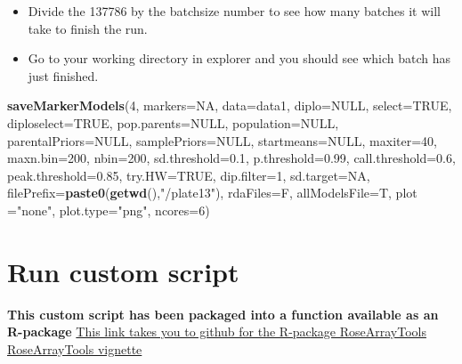\documentclass[
]{article}
\newenvironment{Shaded}{\begin{snugshade}}{\end{snugshade}}
\newcommand{\DataTypeTok}[1]{\textcolor[rgb]{0.13,0.29,0.53}{#1}}
\newcommand{\DecValTok}[1]{\textcolor[rgb]{0.00,0.00,0.81}{#1}}
\newcommand{\FloatTok}[1]{\textcolor[rgb]{0.00,0.00,0.81}{#1}}
\newcommand{\KeywordTok}[1]{\textcolor[rgb]{0.13,0.29,0.53}{\textbf{#1}}}
\newcommand{\NormalTok}[1]{#1}
\newcommand{\OtherTok}[1]{\textcolor[rgb]{0.56,0.35,0.01}{#1}}
\newcommand{\StringTok}[1]{\textcolor[rgb]{0.31,0.60,0.02}{#1}}
\begin{document}
\begin{itemize}
\item
  Divide the 137786 by the batchsize number to see how many batches it
  will take to finish the run.
\item
  Go to your working directory in explorer and you should see which
  batch has just finished.
\end{itemize}

\begin{Shaded}
\begin{Highlighting}[]
\KeywordTok{saveMarkerModels}\NormalTok{(}\DecValTok{4}\NormalTok{, }\DataTypeTok{markers=}\OtherTok{NA}\NormalTok{, }\DataTypeTok{data=}\NormalTok{data1, }\DataTypeTok{diplo=}\OtherTok{NULL}\NormalTok{, }\DataTypeTok{select=}\OtherTok{TRUE}\NormalTok{,}
                 \DataTypeTok{diploselect=}\OtherTok{TRUE}\NormalTok{, }\DataTypeTok{pop.parents=}\OtherTok{NULL}\NormalTok{, }\DataTypeTok{population=}\OtherTok{NULL}\NormalTok{, }\DataTypeTok{parentalPriors=}\OtherTok{NULL}\NormalTok{,}
                 \DataTypeTok{samplePriors=}\OtherTok{NULL}\NormalTok{, }\DataTypeTok{startmeans=}\OtherTok{NULL}\NormalTok{, }\DataTypeTok{maxiter=}\DecValTok{40}\NormalTok{, }\DataTypeTok{maxn.bin=}\DecValTok{200}\NormalTok{, }\DataTypeTok{nbin=}\DecValTok{200}\NormalTok{,}
                 \DataTypeTok{sd.threshold=}\FloatTok{0.1}\NormalTok{, }\DataTypeTok{p.threshold=}\FloatTok{0.99}\NormalTok{, }\DataTypeTok{call.threshold=}\FloatTok{0.6}\NormalTok{, }\DataTypeTok{peak.threshold=}\FloatTok{0.85}\NormalTok{,}
                 \DataTypeTok{try.HW=}\OtherTok{TRUE}\NormalTok{, }\DataTypeTok{dip.filter=}\DecValTok{1}\NormalTok{, }\DataTypeTok{sd.target=}\OtherTok{NA}\NormalTok{,}
                 \DataTypeTok{filePrefix=}\KeywordTok{paste0}\NormalTok{(}\KeywordTok{getwd}\NormalTok{(),}\StringTok{"/plate13"}\NormalTok{), }\DataTypeTok{rdaFiles=}\NormalTok{F, }\DataTypeTok{allModelsFile=}\NormalTok{T,}
                 \DataTypeTok{plot =}\StringTok{"none"}\NormalTok{, }\DataTypeTok{plot.type=}\StringTok{"png"}\NormalTok{, }\DataTypeTok{ncores=}\DecValTok{6}\NormalTok{)}
\end{Highlighting}
\end{Shaded}

\hypertarget{run-custom-script}{%
\section{Run custom script}\label{run-custom-script}}

\textbf{This custom script has been packaged into a function available
as an R-package} \href{https://github.com/jeekinlau/RoseArrayTools}{This
link takes you to github for the R-package RoseArrayTools}
\href{https://jeekinlau.github.io/RoseArrayTools/RoseArrayTools_Vignette.html}{RoseArrayTools
vignette}
\end{document}

